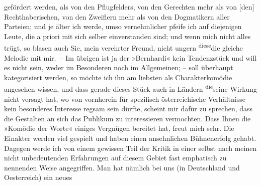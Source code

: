 \begin{ledgroupsized}[t]{13cm}
               gefördert werden, als von den Pflugfelders, von \introOben{}den\introOben{} Gerechten mehr als von
                  {[}den{]} Rechthaberischen, von den Zweiflern mehr als von den
               Dogmatikern aller Parteien\introOben{};\introOben{} und je älter ich werde, umso
               vernehmlicher pfeife ich auf diejenigen Leute, die a
               priori mit sich selber einverstanden sind; und wenn mich nicht alles trügt, so blasen
               auch Sie, mein verehrter Freund, nicht ungern \substVorne{}\textsuperscript{diese}\substDazwischen{}die gleiche\substHinten{} Melodie \introOben{}mit mir\introOben{}. – Im übrigen ist ja der »Bernhardi« kein Tendenzstück und will es nicht
               sein, weder im Besonderen noch im Allgemeinen; – soll überhaupt kategorisiert werden,
               so möchte ich ihn am liebsten als Charakterkomödie angesehen wissen, und dass gerade
               dieses Stück auch in Ländern \substVorne{}\textsuperscript{die}\substDazwischen{}seine\substHinten{} Wirkung nicht versagt hat, wo von vornherein für spezifisch österreichische Verhältnisse kein besonderes
               Interesse regsam sein dürfte, scheint mir dafür zu sprechen, dass die Gestalten an
               sich das Publikum zu interessieren vermochten.\pend
           \pstart
           {\pb}Dass Ihnen die »Komödie der Worte« einiges Vergnügen bereitet hat, freut mich sehr. Die
               Einakter werden viel gespielt und haben einen ansehnlichen Bühnenerfolg gehabt.
               Dagegen werde ich von einem gewissen Teil der Kritik in einer selbst nach meinen
               nicht unbedeutenden Erfahrungen auf diesem Gebiet fast emphatisch zu nennenden Weise
               angegriffen. Man hat nämlich bei uns (in Deutschland und Oesterreich) ein neues

\end{ledgroupsized}
